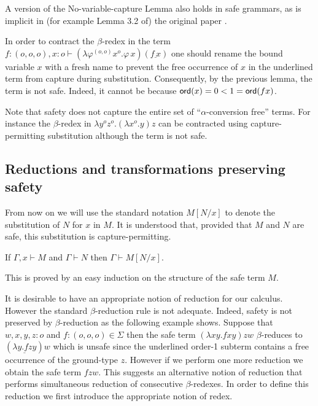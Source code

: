 \documentclass{llncs}
\newcommand\subst[2]{\left[ #1/#2 \right]}
\begin{document}
\begin{remark}
  A version of the No-variable-capture Lemma also holds in safe
  grammars, as is implicit in (for example Lemma 3.2 of) the original
  paper \cite{KNU02}.
\end{remark}

\begin{example}
  In order to contract the $\beta$-redex in the term $f:(o,o,o),x:o
  \vdash (\lambda \varphi^{(o,o)} x^o . \varphi \, x) (\underline{f \,
    x})$ one should rename the bound variable $x$ with a fresh name to
  prevent the free occurrence of $x$ in the underlined term from
  capture during substitution. Consequently, by the previous lemma,
  the term is not safe. Indeed, it cannot be because ${\sf ord}(x) = 0 < 1
  = {\sf ord}(f x)$.
\end{example}

Note that safety does not capture the entire set of
``$\alpha$-conversion free'' terms. For instance the $\beta$-redex in
$\lambda y^o z^o. (\lambda x^o .y) z$ can be contracted using
capture-permitting substitution although the term is not safe.

\subsection*{Reductions and transformations preserving safety}

From now on we will use the standard notation $M\subst{N}{x}$ to
denote the substitution of $N$ for $x$ in $M$.  It is understood that,
provided that $M$ and $N$ are safe, this substitution is
capture-permitting.


\begin{lemma}
\label{lem:subst_preserve_safety}
If $\Gamma, x \vdash M$ and $\Gamma \vdash N$ then $\Gamma \vdash M[N/x]$.
\end{lemma}
This is proved by an easy induction on the structure of the safe term $M$.


It is desirable to have an appropriate notion of reduction for our
calculus. However the standard $\beta$-reduction rule is not
adequate. Indeed, safety is not preserved by $\beta$-reduction as the
following example shows. Suppose that $w,x,y,z : o$ and $f : (o,o,o)
\in \Sigma$ then the safe term $(\lambda x y . f x y) z w$
$\beta$-reduces to $(\underline{\lambda y . f z y}) w$ which is unsafe
since the underlined order-1 subterm contains a free occurrence of the
ground-type $z$. However if we perform one more reduction we obtain
the safe term $f z w$. This suggests an alternative notion of
reduction that performs simultaneous reduction of consecutive
$\beta$-redexes. In order to define this reduction we first introduce
the appropriate notion of redex.
\end{document}
